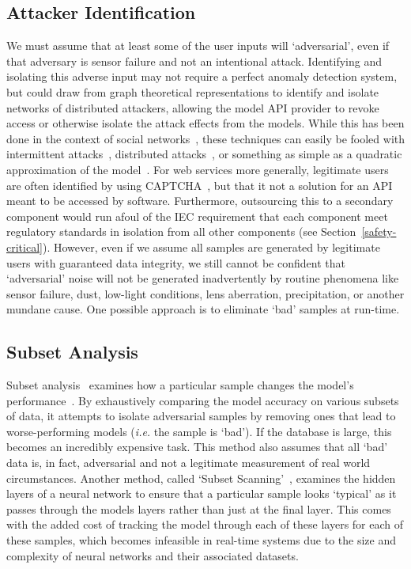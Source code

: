 \documentclass[journal]{IEEEtran}
\newcommand{\ie}{\textit{i.e.}\xspace}
\begin{document}
\subsection{Attacker Identification}

We must assume that at least some of the user inputs will `adversarial', even if that adversary is sensor failure and not an intentional attack. Identifying and isolating this adverse input may not require a perfect anomaly detection system, but could draw from graph theoretical representations to identify and isolate networks of distributed attackers, allowing the model API provider to revoke access or otherwise isolate the attack effects from the models. While this has been done in the context of social networks~\cite{daya_graph-based_2019}, these techniques can easily be fooled with intermittent attacks~\cite{intermittent}, distributed attacks~\cite{distributed_attacks}, or something as simple as a quadratic approximation of the model~\cite{hopskipjump}. For web services more generally, legitimate users are often identified by using CAPTCHA~\cite{ahn2003captcha}, but that it not a solution for an API meant to be accessed by software. Furthermore, outsourcing this to a secondary component would run afoul of the IEC requirement that each component meet regulatory standards in isolation from all other components (see Section~\ref{safety-critical}). However, even if we assume all samples are generated by legitimate users with guaranteed data integrity, we still cannot be confident that `adversarial' noise will not be generated inadvertently by routine phenomena like sensor failure, dust, low-light conditions, lens aberration, precipitation, or another mundane cause. One possible approach is to eliminate `bad' samples at run-time.

\subsection{Subset Analysis}

Subset analysis~\cite{paudice_detection_2018} examines how a particular sample changes the model's performance~\cite{paudice_detection_2018}. By exhaustively comparing the model accuracy on various subsets of data, it attempts to isolate adversarial samples by removing ones that lead to worse-performing models (\ie the sample is `bad'). If the database is large, this becomes an incredibly expensive task. This method also assumes that all `bad' data is, in fact, adversarial and not a legitimate measurement of real world circumstances. Another method, called `Subset Scanning'~\cite{cintas_detecting_2020}, examines the hidden layers of a neural network to ensure that a particular sample looks `typical' as it passes through the models layers rather than just at the final layer. This comes with the added cost of tracking the model through each of these layers for each of these samples, which becomes infeasible in real-time systems due to the size and complexity of neural networks and their associated datasets.
\end{document}
